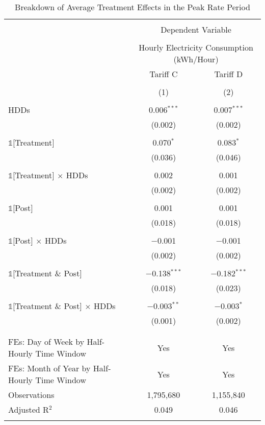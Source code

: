 
\begin{table}[!htbp] \centering 
  \caption{Breakdown of Average Treatment Effects in the Peak Rate Period} 
  \label{Table:Breakdown-of-Average-Treatment-Effects-in-the-Peak-Rate-Period_For-Each-Tariff} 
\small 
\begin{tabular}{@{\extracolsep{20pt}}lcc} 
\\[-1.8ex]\hline 
\hline \\[-1.8ex] 
 & \multicolumn{2}{c}{Dependent Variable} \\ 
\cline{2-3} 
\\[-1.8ex] & \multicolumn{2}{c}{Hourly Electricity Consumption  (kWh/Hour)} \\ 
 & Tariff C & Tariff D \\ 
\\[-1.8ex] & (1) & (2)\\ 
\hline \\[-1.8ex] 
 HDDs & 0.006$^{***}$ & 0.007$^{***}$ \\ 
  & (0.002) & (0.002) \\ 
  & & \\ 
 $\mathbb{1}$[Treatment] & 0.070$^{*}$ & 0.083$^{*}$ \\ 
  & (0.036) & (0.046) \\ 
  & & \\ 
 $\mathbb{1}$[Treatment] $\times$ HDDs & 0.002 & 0.001 \\ 
  & (0.002) & (0.002) \\ 
  & & \\ 
 $\mathbb{1}$[Post] & 0.001 & 0.001 \\ 
  & (0.018) & (0.018) \\ 
  & & \\ 
 $\mathbb{1}$[Post] $\times$ HDDs & $-$0.001 & $-$0.001 \\ 
  & (0.002) & (0.002) \\ 
  & & \\ 
 $\mathbb{1}$[Treatment \& Post] & $-$0.138$^{***}$ & $-$0.182$^{***}$ \\ 
  & (0.018) & (0.023) \\ 
  & & \\ 
 $\mathbb{1}$[Treatment \& Post] $\times$ HDDs & $-$0.003$^{**}$ & $-$0.003$^{*}$ \\ 
  & (0.001) & (0.002) \\ 
  & & \\ 
\hline \\[-1.8ex] 
FEs: Day of Week by Half-Hourly Time Window & Yes & Yes \\ 
FEs: Month of Year by Half-Hourly Time Window & Yes & Yes \\ 
Observations & 1,795,680 & 1,155,840 \\ 
Adjusted R$^{2}$ & 0.049 & 0.046 \\ 
\hline 
\hline \\[-1.8ex] 
\end{tabular} 
\end{table} 
